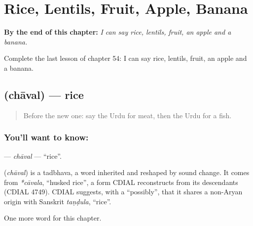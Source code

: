 
\chapter{Rice, Lentils, Fruit, Apple, Banana}
\label{ch:ur-rice-lentils-fruit-apple-banana}

\begin{chapteropening}
\textbf{By the end of this chapter:} \emph{I can say rice, lentils, fruit, an apple and a banana.}

Complete the last lesson of chapter 54: I can say rice, lentils, fruit, an apple and a banana.
\end{chapteropening}

\section[\texorpdfstring{\ur{چاول} (chāval)}{چاول (chāval)}]{ (chāval) — rice}

\label{lesson:UR-C54-chaval}



\begin{quote}
Before the new one: say the Urdu for meat, then the Urdu for a fish.
\end{quote}

\subsection*{You'll want to know: }
\textbf{} — \emph{chāval} — \textquotedblleft{}rice\textquotedblright{}.

\begin{cousinweb}
\textbf{} (\emph{chāval}) is a tadbhava, a word inherited and reshaped by sound change. It comes from \emph{*cāvala}, \textquotedblleft{}husked rice\textquotedblright{}, a form CDIAL reconstructs from its descendants (CDIAL 4749). CDIAL suggests, with a \textquotedblleft{}possibly\textquotedblright{}, that it shares a non-Aryan origin with Sanskrit \emph{taṇḍula}, \textquotedblleft{}rice\textquotedblright{}.
\end{cousinweb}

\begin{grammarlens}[title={What you've built}]
One more word for this chapter.
\end{grammarlens}

